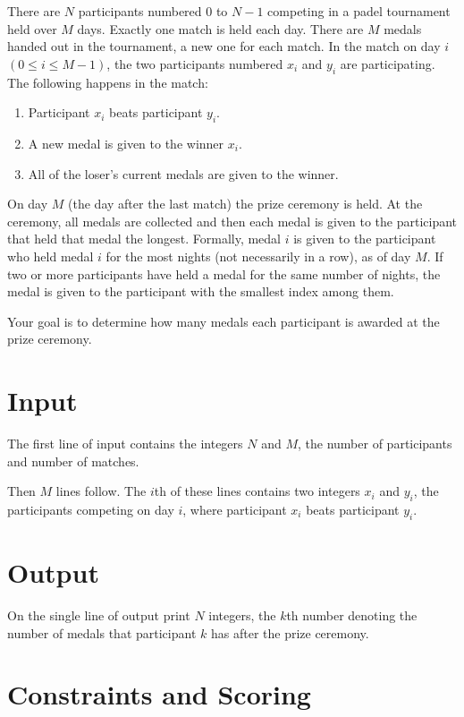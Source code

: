 There are $N$ participants numbered $0$ to $N-1$ competing in a padel tournament held over $M$ days. Exactly one match is held each day.
There are $M$ medals handed out in the tournament, a new one for each match.
In the match on day $i$ $(0 \le i \le M-1)$, the two participants numbered $x_i$ and $y_i$ are participating.
The following happens in the match:

\begin{enumerate}
    \item Participant $x_i$ beats participant $y_i$.
    \item A new medal is given to the winner $x_i$.
    \item All of the loser's current medals are given to the winner.
\end{enumerate}

On day $M$ (the day after the last match) the prize ceremony is held. At the ceremony, all medals are collected and then each medal is 
given to the participant that held that medal the longest.
Formally, medal $i$ is given to the participant who held medal $i$ for the most nights (not necessarily in a row), as of day $M$.
If two or more participants have held a medal for the same number of nights, the medal is given to the participant with the smallest index among them.

Your goal is to determine how many medals each participant is awarded at the prize ceremony.


\section*{Input}
The first line of input contains the integers $N$ and $M$,
the number of participants and number of matches.

Then $M$ lines follow. The $i$th of these lines contains two integers $x_i$ and $y_i$, the participants competing on day $i$,
where participant $x_i$ beats participant $y_i$.

\section*{Output}
On the single line of output print $N$ integers, the $k$th number denoting the number of medals that participant $k$ 
has after the prize ceremony. 

\section*{Constraints and Scoring}

